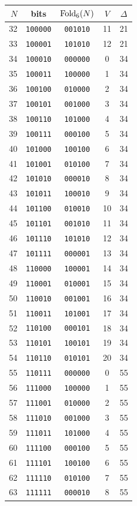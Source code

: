 \begin{tabular}{rcccc}%
\hline%
\textbf{$N$}&\textbf{bits}&\textbf{$\mathrm{Fold}_6(N)$}&\textbf{$V$}&\textbf{$\Delta$}\\%
\hline%
32&\texttt{100000}&\texttt{001010}&11&21\\%
33&\texttt{100001}&\texttt{101010}&12&21\\%
34&\texttt{100010}&\texttt{000000}&0&34\\%
35&\texttt{100011}&\texttt{100000}&1&34\\%
36&\texttt{100100}&\texttt{010000}&2&34\\%
37&\texttt{100101}&\texttt{001000}&3&34\\%
38&\texttt{100110}&\texttt{101000}&4&34\\%
39&\texttt{100111}&\texttt{000100}&5&34\\%
40&\texttt{101000}&\texttt{100100}&6&34\\%
41&\texttt{101001}&\texttt{010100}&7&34\\%
42&\texttt{101010}&\texttt{000010}&8&34\\%
43&\texttt{101011}&\texttt{100010}&9&34\\%
44&\texttt{101100}&\texttt{010010}&10&34\\%
45&\texttt{101101}&\texttt{001010}&11&34\\%
46&\texttt{101110}&\texttt{101010}&12&34\\%
47&\texttt{101111}&\texttt{000001}&13&34\\%
48&\texttt{110000}&\texttt{100001}&14&34\\%
49&\texttt{110001}&\texttt{010001}&15&34\\%
50&\texttt{110010}&\texttt{001001}&16&34\\%
51&\texttt{110011}&\texttt{101001}&17&34\\%
52&\texttt{110100}&\texttt{000101}&18&34\\%
53&\texttt{110101}&\texttt{100101}&19&34\\%
54&\texttt{110110}&\texttt{010101}&20&34\\%
55&\texttt{110111}&\texttt{000000}&0&55\\%
56&\texttt{111000}&\texttt{100000}&1&55\\%
57&\texttt{111001}&\texttt{010000}&2&55\\%
58&\texttt{111010}&\texttt{001000}&3&55\\%
59&\texttt{111011}&\texttt{101000}&4&55\\%
60&\texttt{111100}&\texttt{000100}&5&55\\%
61&\texttt{111101}&\texttt{100100}&6&55\\%
62&\texttt{111110}&\texttt{010100}&7&55\\%
63&\texttt{111111}&\texttt{000010}&8&55\\%
\hline%
\end{tabular}
